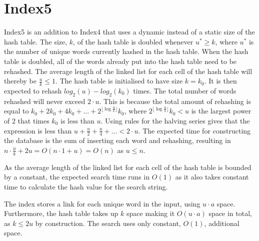 \section{Index5}
\label{section:Index5}

Index5 is an addition to Index4 that uses a dynamic instead of a static size of the hash table. The size, $k$, of the hash table is doubled whenever $u^*\geq k$, where $u^*$ is the number of unique words currently hashed in the hash table. When the hash table is doubled, all of the words already put into the hash table need to be rehashed. The average length of the linked list for each cell of the hash table will thereby be $\frac{u}{k} \leq 1$. The hash table is initialised to have size $k=k_0$. It is then expected to rehash $log_2(u)-log_2(k_0)$ times. The total number of words rehashed will never exceed $2\cdot u$. This is because the total amount of rehashing is equal to $k_0 + 2k_0 + 4k_0 + \dots + 2^{\lfloor\log\frac{u}{k}\rfloor}k_0$, where $2^{\lfloor\log\frac{u}{k}\rfloor}k_0 < u$ is the largest power of 2 that times $k_0$ is less than $u$. Using rules for the halving series gives that the expression is less than $u + \frac{u}{2} + \frac{u}{4} + ... < 2\cdot u$. The expected time for constructing the database is the sum of inserting each word and rehashing, resulting in $n\cdot \frac{u}{k} + 2u = O(n\cdot 1+u)=O(n)$ as $u\leq n$.

As the average length of the linked list for each cell of the hash table is bounded by a constant, the expected search time runs in $O(1)$ as it also takes constant time to calculate the hash value for the search string.

The index stores a link for each unique word in the input, using $u\cdot a$ space. Furthermore, the hash table takes up $k$ space making it $O(u\cdot a)$ space in total, as $k\leq 2u$ by construction. The search uses only constant, $O(1)$, additional space. 
